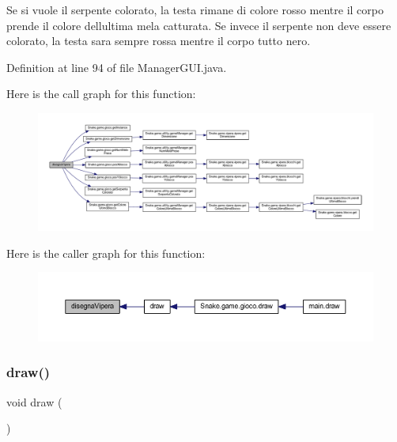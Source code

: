 Se si vuole il serpente colorato, la testa rimane di colore rosso mentre il corpo prende il colore dell\textquotesingle{}ultima mela catturata. Se invece il serpente non deve essere colorato, la testa sara\textquotesingle{} sempre rossa mentre il corpo tutto nero. 

Definition at line 94 of file Manager\+G\+U\+I.\+java.

Here is the call graph for this function\+:
\nopagebreak
\begin{figure}[H]
\begin{center}
\leavevmode
\includegraphics[width=350pt]{class_snake_1_1gui_1_1_manager_g_u_i_a0e0d67c4f526a64346a8b90e7c9d673d_cgraph}
\end{center}
\end{figure}
Here is the caller graph for this function\+:
\nopagebreak
\begin{figure}[H]
\begin{center}
\leavevmode
\includegraphics[width=350pt]{class_snake_1_1gui_1_1_manager_g_u_i_a0e0d67c4f526a64346a8b90e7c9d673d_icgraph}
\end{center}
\end{figure}
\mbox{\label{class_snake_1_1gui_1_1_manager_g_u_i_a56c5cf8a568cff737ff95520cbe6b405}} 
\subsubsection{\texorpdfstring{draw()}{draw()}}
{\footnotesize\ttfamily void draw (\begin{DoxyParamCaption}{ }\end{DoxyParamCaption})}



